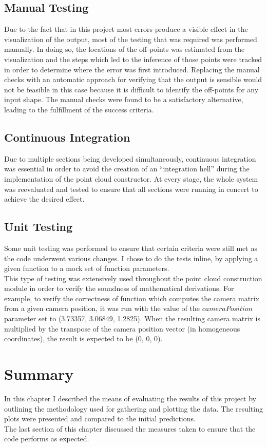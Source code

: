\documentclass[12pt,a4paper,twoside,openright]{report}
\begin{document}
\subsection{Manual Testing}
Due to the fact that in this project most errors produce a visible effect in the visualization of the output, most of the testing that was required was performed manually. In doing so, the locations of the off-points was estimated from the visualization and the steps which led to the inference of those points were tracked in order to determine where the error was first introduced. Replacing the manual checks with an automatic approach for verifying that the output is sensible would not be feasible in this case because it is difficult to identify the off-points for any input shape. The manual checks were found to be a satisfactory alternative, leading to the fulfillment of the success criteria.
\subsection{Continuous Integration}
Due to multiple sections being developed simultaneously, continuous integration was essential in order to avoid the creation of an \enquote{integration hell} during the implementation of the point cloud constructor. At every stage, the whole system was reevaluated and tested to ensure that all sections were running in concert to achieve the desired effect.
\subsection{Unit Testing}
Some unit testing was performed to ensure that certain criteria were still met as the code underwent various changes. I chose to do the tests inline, by applying a given function to a mock set of function parameters.\\
This type of testing was extensively used throughout the point cloud construction module in order to verify the soundness of mathematical derivations. For example, to verify the correctness of function which computes the camera matrix from a given camera position, it was run with the value of the $cameraPosition$ parameter set to (3.73357, 3.06849, 1.2825). When the resulting camera matrix is multiplied by the transpose of the camera position vector (in homogeneous coordinates), the result is expected to be (0, 0, 0). 

\section{Summary}
In this chapter I described the means of evaluating the results of this project by outlining the methodology used for gathering and plotting the data. The resulting plots were presented and compared to the initial predictions.\\ 
The last section of this chapter discussed the measures taken to ensure that the code performs as expected.
\end{document}
